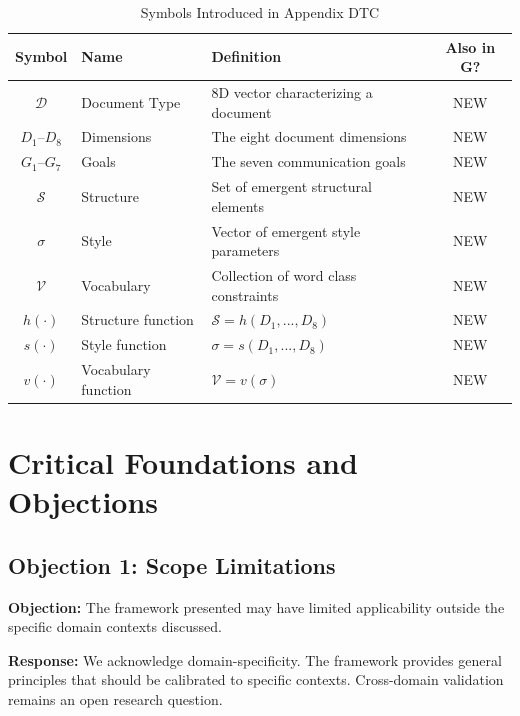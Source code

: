 \vspace{0.5em}

\begin{table}[htbp]
\centering
\caption{Symbols Introduced in Appendix DTC}
\label{tab:doctype-symbols}
\renewcommand{\arraystretch}{1.3}
\begin{tabular}{@{}clp{6cm}c@{}}
\toprule
\textbf{Symbol} & \textbf{Name} & \textbf{Definition} & \textbf{Also in G?} \\
\midrule
$\mathcal{D}$ & Document Type & 8D vector characterizing a document & NEW \\
$D_1$--$D_8$ & Dimensions & The eight document dimensions & NEW \\
$G_1$--$G_7$ & Goals & The seven communication goals & NEW \\
$\mathcal{S}$ & Structure & Set of emergent structural elements & NEW \\
$\sigma$ & Style & Vector of emergent style parameters & NEW \\
$\mathcal{V}$ & Vocabulary & Collection of word class constraints & NEW \\
$h(\cdot)$ & Structure function & $\mathcal{S} = h(D_1,...,D_8)$ & NEW \\
$s(\cdot)$ & Style function & $\sigma = s(D_1,...,D_8)$ & NEW \\
$v(\cdot)$ & Vocabulary function & $\mathcal{V} = v(\sigma)$ & NEW \\
\bottomrule
\end{tabular}
\end{table}



\section{Critical Foundations and Objections}
\label{sec:dtc-foundations}

\subsection{Objection 1: Scope Limitations}

\textbf{Objection:} The framework presented may have limited applicability
outside the specific domain contexts discussed.

\textbf{Response:} We acknowledge domain-specificity. The framework provides
general principles that should be calibrated to specific contexts. Cross-domain
validation remains an open research question.

